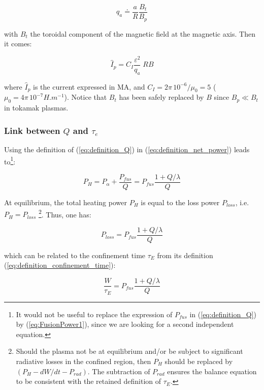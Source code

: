 \begin{equation*}
q_a \doteq \frac{a}{R} \frac{B_t}{B_p} 
\end{equation*}

\noindent
with $B_t$ the toroidal component of the magnetic field at the magnetic axis. Then it comes:

\begin{equation}
	\boxed{\hat I_p = C_I \frac{\varepsilon^2}{q_a} \; R B}
	\label{eq:plasma_current}
\end{equation}

\noindent
where $\hat I_p$ is the current expressed in MA, and $C_I = 2\pi\, 10^{-6} /\mu_0 = 5$  ($\mu_0 = 4\pi\, 10^{-7} \si{H.m^{-1}}$).
Notice that $B_t$ has been safely replaced by $B$ since $B_p\ll B_t$ in tokamak plasmas. 

\subsubsection{Link between $Q$ and $\tau_e$}
Using the definition of (\ref{eq:definition_Q}) in (\ref{eq:definition_net_power}) leads to\footnote{It would not be useful to replace the expression of $P_{fus}$ in (\ref{eq:definition_Q}) by (\ref{eq:FusionPower1}), since we are looking for a second independent equation. }:

\begin{equation}
	P_H = P_\alpha + \frac{P_{fus}}{Q} = P_{fus} \frac{1 + Q/\lambda}{Q}
\end{equation}

At equilibrium, the total heating power $P_H$ is equal to the loss power $P_{loss}$, i.e. $P_{H} =P_{loss}$ \footnote{Should the plasma not be at equilibrium and/or be subject to significant radiative losses in the confined region, then $P_{H}$ should be replaced by $(P_{H}-dW/dt-P_{rad})$. The subtraction of $P_{rad}$ ensures the balance equation to be consistent with the retained definition of $\tau_E$.}. Thus, one has:

\begin{equation}
	P_{loss} = P_{fus} \frac{1 + Q/\lambda}{Q}
\end{equation}

\noindent
which can be related to the confinement time $\tau_E$ from its definition  (\ref{eq:definition_confinement_time}):

\begin{equation}
	\frac{ W }{ \tau_E } = P_{fus} \frac{1 + Q/\lambda}{Q}
	\label{eq:link_btw_Q_and_tau_E}
\end{equation}

